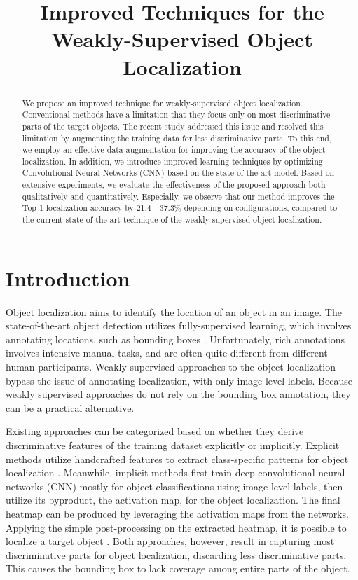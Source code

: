 \documentclass{bmvc2k}
\title{Improved Techniques for the\\ Weakly-Supervised Object Localization}
\begin{document}
\maketitle

\begin{abstract}
We propose an improved technique for weakly-supervised object localization. Conventional methods have a limitation that they focus only on most discriminative parts of the target objects. The recent study addressed this issue and resolved this limitation by augmenting the training data for less discriminative parts. To this end, we employ an effective data augmentation for improving the accuracy of the object localization. In addition, we introduce improved learning techniques by optimizing Convolutional Neural Networks (CNN) based on the state-of-the-art model. Based on extensive experiments, we evaluate the effectiveness of the proposed approach both qualitatively and quantitatively. Especially, we observe that our method improves the Top-1 localization accuracy by 21.4 - 37.3\% depending on configurations, compared to the current state-of-the-art technique of the weakly-supervised object localization.
\end{abstract}

\section{Introduction}
\label{sec:intro}
Object localization aims to identify the location of an object in an image. The state-of-the-art object detection utilizes fully-supervised learning, which involves annotating locations, such as bounding boxes \cite{liu2016ssd,  redmon2016yolo, redmon2016yolo9000, ren2017faster}. Unfortunately, rich annotations involves intensive manual tasks, and are often quite different from different human participants. Weakly supervised approaches to the object localization bypass the issue of annotating localization, with only image-level labels. Because weakly supervised approaches do not rely on the bounding box annotation, they can be a practical alternative.

Existing approaches can be categorized based on whether they derive discriminative features of the training dataset explicitly or implicitly. Explicit methods utilize handcrafted features to extract class-specific patterns for object localization \cite{weber2000unsupervised, fergus2003object, bilen2014weakly, song2014learning, cinbis2014multi, song2014weakly, cinbis2017weakly}. Meanwhile, implicit methods first train deep convolutional neural networks (CNN) mostly for object classifications using image-level labels, then utilize its byproduct, the activation map, for the object localization. The final heatmap can be produced by leveraging the activation maps from the networks. Applying the simple post-processing on the extracted heatmap, it is possible to localize a target object \cite{simonyan2013deep, oquab2015object, zhou2016learning}. Both approaches, however, result in capturing most discriminative parts for object localization, discarding less discriminative parts. This causes the bounding box to lack coverage among entire parts of the object. 
\end{document}
